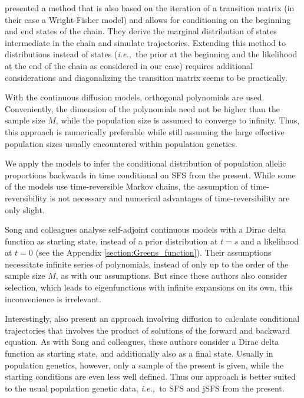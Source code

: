 \documentclass[preprint]{elsarticle}
\newcommand\ie{{\it i.e.,}}
\begin{document}
\citet{Zhao14} presented a method that is also based on the iteration of a transition matrix (in their case a Wright-Fisher model) and allows for conditioning on the beginning and end states of the chain. They derive the marginal distribution of states intermediate in the chain and simulate trajectories. Extending this method to distributions instead of states (\ie\ the prior at the beginning and the likelihood at the end of the chain as considered in our case) requires additional considerations and diagonalizing the transition matrix seems to be practically. 

With the continuous diffusion models, orthogonal polynomials are used. Conveniently, the dimension of the polynomials need not be higher than the sample size $M$, while the population size is assumed to converge to infinity. Thus, this approach is numerically preferable while still assuming the large effective population sizes usually encountered within population genetics. 

We apply the models to infer the conditional distribution of population allelic proportions backwards in time conditional on SFS from the present. While some of the models use time-reversible Markov chains, the assumption of time-reversibility is not necessary and numerical advantages of time-reversibility are only slight.

Song and colleagues \citep{Song12,Stei13,Stei14,Zivk15} analyse self-adjoint continuous models with a Dirac delta function as starting state, instead of a prior distribution at $t=s$ and a likelihood at $t=0$ (see the Appendix \ref{section:Greens_function}). Their assumptions necessitate infinite series of polynomials, instead of only up to the order of the sample size $M$, as with our assumptions. But since these authors also consider selection, which leads to eigenfunctions with infinite expansions on its own, this inconvenience is irrelevant. 

Interestingly, \citet{Zhao13} also present an approach involving diffusion to calculate conditional trajectories that involves the product of solutions of the forward and backward equation. As with Song and colleagues, these authors consider a Dirac delta function as starting state, and additionally also as a final state. Usually in population genetics, however, only a sample of the present is given, while the starting conditions are even less well defined. Thus our approach is better suited to the usual population genetic data, \ie\ to SFS and jSFS from the present. 
\end{document}
